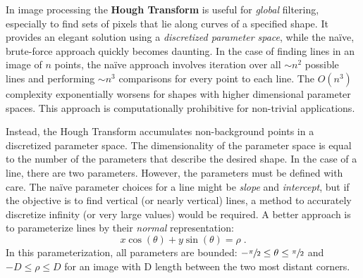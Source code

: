 In image processing the \textbf{Hough Transform} is useful for \textit{global} filtering, especially to find sets of pixels that lie along curves of a specified shape. It provides an elegant solution using a \textit{discretized parameter space}, while the na\"ive, brute-force approach quickly becomes daunting. In the case of finding lines in an image of $n$ points, the na\"ive approach involves iteration over all $\sim\!\! n^2$ possible lines and performing $\sim\!\! n^3$ comparisons for every point to each line. The $O(n^3)$  complexity exponentially worsens for shapes with higher dimensional parameter spaces. This approach is computationally prohibitive for non-trivial applications.

Instead, the Hough Transform accumulates non-background points in a discretized parameter space. The dimensionality of the parameter space is equal to the number of the parameters that describe the desired shape. In the case of a line, there are two parameters. However, the parameters must be defined with care. The na\"ive parameter choices for a line might be \textit{slope} and \textit{intercept}, but if the objective is to find vertical (or nearly vertical) lines, a method to accurately discretize infinity (or very large values) would be required. A better approach is to parameterize lines by their \textit{normal} representation:
\begin{equation}
x \cos (\theta) + y \sin(\theta) = \rho \; .
\end{equation}
In this parameterization, all parameters are bounded: $-\sfrac{\pi}{2} \leq \theta \leq \sfrac{\pi}{2}$ and $-D\leq \rho \leq D$ for an image with D length between the two most distant corners.